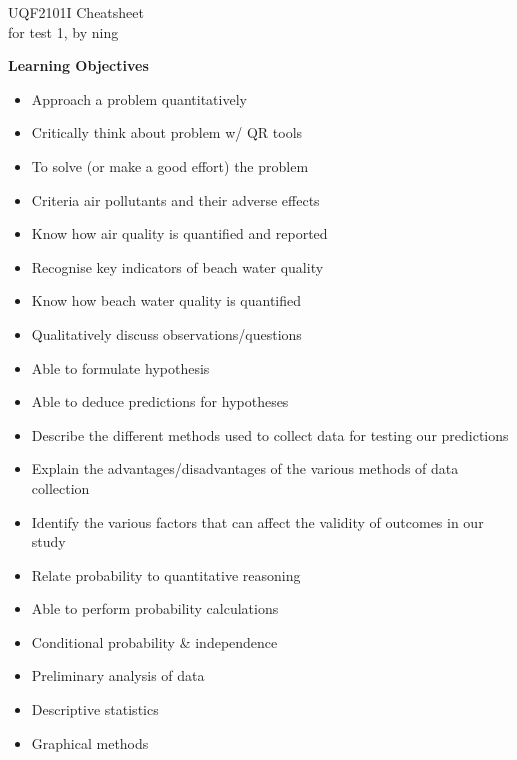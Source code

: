 \documentclass{article}
\newcommand{\headingsmall}[1]{{\small\textbf{#1}}}
\begin{document}
\scriptsize                %
\setlength\parindent{0pt}  %

\begin{center}
{\large UQF2101I Cheatsheet}\\{for test 1, by ning}
\end{center}

\begin{multicols*}{4}

\headingsmall{Learning Objectives}
\begin{itemize} \itemsep -0.5em
    \item Approach a problem quantitatively
    \item Critically think about problem w/ QR tools
    \item To solve (or make a good effort) the problem
    \item Criteria air pollutants and their adverse effects
    \item Know how air quality is quantified and reported
    \item Recognise key indicators of beach water quality
    \item Know how beach water quality is quantified
    \item Qualitatively discuss observations/questions
    \item Able to formulate hypothesis
    \item Able to deduce predictions for hypotheses
    \item Describe the different methods used to collect data for testing 
        our predictions
    \item Explain the advantages/disadvantages of the various methods of
        data collection
    \item Identify the various factors that can affect the validity of outcomes
        in our study
    \item Relate probability to quantitative reasoning
    \item Able to perform probability calculations
    \item Conditional probability \& independence
    \item Preliminary analysis of data
    \item Descriptive statistics
    \item Graphical methods
\end{itemize}


\end{multicols*}
\end{document}
